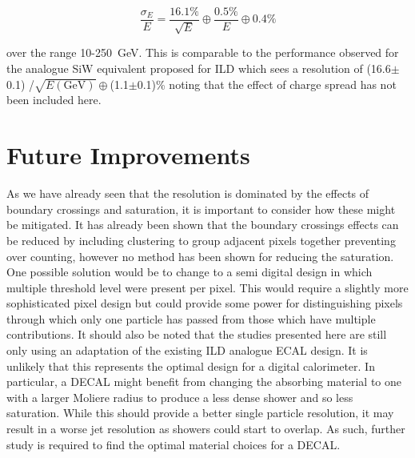 \begin{equation}
  \frac{\sigma_E}{E}=\frac{16.1\%}{\sqrt{E}} \oplus \frac{0.5\%}{E} \oplus 0.4\%
\end{equation}

over the range 10-250~GeV. This is comparable to the performance observed for the analogue SiW equivalent proposed for \ac{ILD} which sees a resolution of (16.6$\pm$0.1) /$\sqrt{E(\text{GeV})} \oplus$(1.1$\pm$0.1)\% noting that the effect of charge spread has not been included here.


\section{Future Improvements}

As we have already seen that the resolution is dominated by the effects of boundary crossings and saturation, it is important to consider how these might be mitigated. It has already been shown that the boundary crossings effects can be reduced by including clustering to group adjacent pixels together preventing over counting, however no method has been shown for reducing the saturation. One possible solution would be to change to a semi digital design in which multiple threshold level were present per pixel. This would require a slightly more sophisticated pixel design but could provide some power for distinguishing pixels through which only one particle has passed from those which have multiple contributions. It should also be noted that the studies presented here are still only using an adaptation of the existing \ac{ILD} analogue \ac{ECAL} design. It is unlikely that this represents the optimal design for a digital calorimeter. In particular, a \ac{DECAL} might benefit from changing the absorbing material to one with a larger Moliere radius to produce a less dense shower and so less saturation. While this should provide a better single particle resolution, it may result in a worse jet resolution as showers could start to overlap. As such, further study is required to find the optimal material choices for a \ac{DECAL}.


